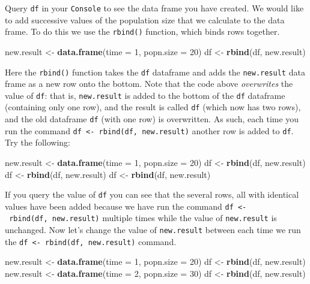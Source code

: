 \documentclass[]{book}
\newenvironment{Shaded}{\begin{snugshade}}{\end{snugshade}}
\newcommand{\KeywordTok}[1]{\textcolor[rgb]{0.13,0.29,0.53}{\textbf{{#1}}}}
\newcommand{\DataTypeTok}[1]{\textcolor[rgb]{0.13,0.29,0.53}{{#1}}}
\newcommand{\DecValTok}[1]{\textcolor[rgb]{0.00,0.00,0.81}{{#1}}}
\newcommand{\StringTok}[1]{\textcolor[rgb]{0.31,0.60,0.02}{{#1}}}
\newcommand{\NormalTok}[1]{{#1}}
\begin{document}
Query \texttt{df} in your \texttt{Console} to see the data frame you
have created. We would like to add successive values of the population
size that we calculate to the data frame. To do this we use the
\texttt{rbind()} function, which binds rows together.

\begin{Shaded}
\begin{Highlighting}[]
\NormalTok{new.result <-}\StringTok{ }\KeywordTok{data.frame}\NormalTok{(}\DataTypeTok{time =} \DecValTok{1}\NormalTok{, }\DataTypeTok{popn.size =} \DecValTok{20}\NormalTok{)}
\NormalTok{df <-}\StringTok{ }\KeywordTok{rbind}\NormalTok{(df, new.result)}
\end{Highlighting}
\end{Shaded}

Here the \texttt{rbind()} function takes the \texttt{df} dataframe and
adds the \texttt{new.result} data frame as a new row onto the bottom.
Note that the code above \emph{overwrites} the value of \texttt{df}:
that is, \texttt{new.result} is added to the bottom of the \texttt{df}
dataframe (containing only one row), and the result is called
\texttt{df} (which now has two rows), and the old dataframe \texttt{df}
(with one row) is overwritten. As such, each time you run the command
\texttt{df\ \textless{}-\ rbind(df,\ new.result)} another row is added
to \texttt{df}. Try the following:

\begin{Shaded}
\begin{Highlighting}[]
\NormalTok{new.result <-}\StringTok{ }\KeywordTok{data.frame}\NormalTok{(}\DataTypeTok{time =} \DecValTok{1}\NormalTok{, }\DataTypeTok{popn.size =} \DecValTok{20}\NormalTok{)}
\NormalTok{df <-}\StringTok{ }\KeywordTok{rbind}\NormalTok{(df, new.result)}
\NormalTok{df <-}\StringTok{ }\KeywordTok{rbind}\NormalTok{(df, new.result)}
\NormalTok{df <-}\StringTok{ }\KeywordTok{rbind}\NormalTok{(df, new.result)}
\end{Highlighting}
\end{Shaded}

If you query the value of \texttt{df} you can see that the several rows,
all with identical values have been added because we have run the
command \texttt{df\ \textless{}-\ rbind(df,\ new.result)} multiple times
while the value of \texttt{new.result} is unchanged. Now let's change
the value of \texttt{new.result} between each time we run the
\texttt{df\ \textless{}-\ rbind(df,\ new.result)} command.

\begin{Shaded}
\begin{Highlighting}[]
\NormalTok{new.result <-}\StringTok{ }\KeywordTok{data.frame}\NormalTok{(}\DataTypeTok{time =} \DecValTok{1}\NormalTok{, }\DataTypeTok{popn.size =} \DecValTok{20}\NormalTok{)}
\NormalTok{df <-}\StringTok{ }\KeywordTok{rbind}\NormalTok{(df, new.result)}
\NormalTok{new.result <-}\StringTok{ }\KeywordTok{data.frame}\NormalTok{(}\DataTypeTok{time =} \DecValTok{2}\NormalTok{, }\DataTypeTok{popn.size =} \DecValTok{30}\NormalTok{)}
\NormalTok{df <-}\StringTok{ }\KeywordTok{rbind}\NormalTok{(df, new.result)}
\end{Highlighting}
\end{Shaded}
\end{document}
